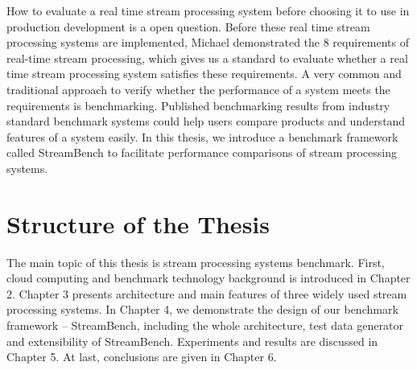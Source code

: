 How to evaluate a real time stream processing system before choosing it to use in production development is a open question.  Before these real time stream processing systems are implemented, Michael demonstrated the 8 requirements\cite{8requirements} of real-time stream processing, which gives us a standard to evaluate whether a real time stream processing system satisfies these requirements.  A very common and traditional approach to verify whether the performance of a system meets the requirements is benchmarking. Published benchmarking results from industry standard benchmark systems could help users compare products and understand features of a system easily. In this thesis, we introduce a benchmark framework called StreamBench to facilitate performance comparisons of stream processing systems. 

\section{Structure of the Thesis}
\label{section:structure} 
The main topic of this thesis is stream processing systems benchmark. First, cloud computing and benchmark technology background is introduced in Chapter 2. Chapter 3 presents architecture and main features of three widely used stream processing systems. In Chapter 4, we demonstrate the design of our benchmark framework -- StreamBench, including the whole architecture, test data generator and extensibility of StreamBench. Experiments and results are discussed in Chapter 5. At last, conclusions are given in Chapter 6.









\clearpage